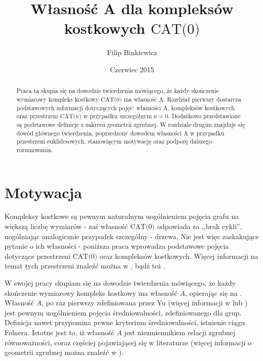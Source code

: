 \documentclass[licencjacka]{pracamgr}
\author{Filip Binkiewicz}
\title{Własność A dla kompleksów kostkowych $\text{CAT(0)}$}
\date{Czerwiec 2015}
\theoremstyle{definition}
\theoremstyle{definition}
\theoremstyle{definition}
\theoremstyle{definition}
\theoremstyle{definition}
\theoremstyle{plain}
\theoremstyle{plain}
\begin{document}
\maketitle


\begin{abstract}

Praca ta skupia się na dowodzie twierdzenia mówiącego, że każdy skończenie wymiarowy 
kompleks kostkowy  $\text{CAT(0)}$ ma własność A. Rozdział pierwszy dostarcza podstawowych 
informacji dotyczących pojęć: własności A, kompleksów kostkowych oraz przestrzeni 
$\text{CAT(} \kappa\text{)} $ w przypadku szczególnym $ \kappa = 0 $. Dodatkowo przedstawione 
są podstawowe definicje z zakresu geometrii zgrubnej. W rozdziale drugim znajduje się dowód 
głównego twierdzenia, poprzedzony dowodem własności A w przypadku przestrzeni euklidesowych, 
stanowiącym motywację oraz podporę dalszego rozumowania.

\end{abstract}

\tableofcontents

\chapter*{Motywacja}

Kompleksy kostkowe są pewnym naturalnym uogólnieniem pojęcia grafu na większą liczbę 
wymiarów - zaś własność $ \text{CAT(0)} $ odpowiada za ,,brak cykli'', uogólniając 
analogicznie przypadek szczególny - drzewa. Nie jest 
więc zaskakujące pytanie o ich własności - poniższa praca wprowadza podstawowe 
pojęcia dotyczące przestrzeni $ \text{CAT(0)} $ oraz kompleksów kostkowych. 
Więcej informacji na temat tych przestrzeni znaleźć można w 
\cite{caprace}, \cite{schwer} bądź też \cite{sageev}.

W swojej pracy skupiam się na dowodzie twierdzenia mówiącego, że każdy skończenie 
wymiarowy kompleks kostkowy ma własność $ A $, opierając się na \cite{brodzki}. Własność $ A $, 
po raz pierwszy zdefiniowana przez Yu (więcej informacji w \cite{willett} lub 
\cite{nowak}) 
jest pewnym uogólnieniem pojęcia średniowalności, zdefiniowanego dla grup. Definicja nawet 
przypomina pewne kryterium średniowalności, istnienie 
ciągu Følnera. Istotne jest to, iż własność $ A $ jest niezmiennikiem relacji 
zgrubnej równoważności, coraz częściej pojawiającej się w literaturze (więcej informacji 
o geometrii zgrubnej można znaleźć w \cite{roe}).
\end{document}
